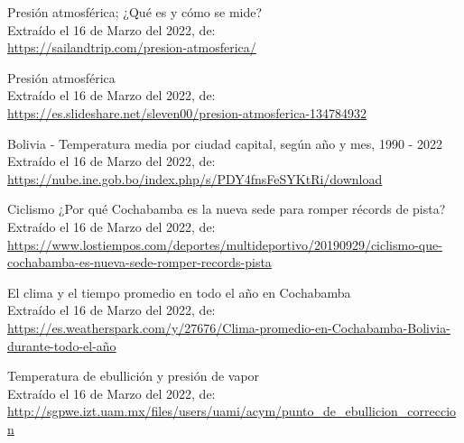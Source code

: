\documentclass[letter,11pt]{article}
\begin{document}
\begin{thebibliography}{99}

 Presión atmosférica; ¿Qué es y cómo se mide?\\
Extraído el 16 de Marzo del 2022, de:\\
\url{https://sailandtrip.com/presion-atmosferica/}
 
 Presión atmosférica\\
Extraído el 16 de Marzo del 2022, de:\\
\url{https://es.slideshare.net/sleven00/presion-atmosferica-134784932}

 Bolivia - Temperatura media por ciudad capital, según año y mes, 1990 - 2022\\
Extraído el 16 de Marzo del 2022, de:\\
\url{https://nube.ine.gob.bo/index.php/s/PDY4fnsFeSYKtRi/download}

 Ciclismo ¿Por qué Cochabamba es la nueva sede para romper récords de pista?\\
Extraído el 16 de Marzo del 2022, de:\\
\url{https://www.lostiempos.com/deportes/multideportivo/20190929/ciclismo-que-cochabamba-es-nueva-sede-romper-records-pista}

 El clima y el tiempo promedio en todo el año en Cochabamba\\
Extraído el 16 de Marzo del 2022, de:\\
\url{https://es.weatherspark.com/y/27676/Clima-promedio-en-Cochabamba-Bolivia-durante-todo-el-año}

 Temperatura de ebullición y presión de vapor\\
Extraído el 16 de Marzo del 2022, de:\\
\url{http://sgpwe.izt.uam.mx/files/users/uami/acym/punto_de_ebullicion_correccion}

\end{thebibliography}
\end{document}

